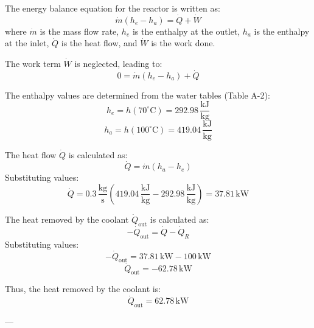 The energy balance equation for the reactor is written as:  
\[
\dot{m} \left( h_e - h_a \right) = \dot{Q} + \dot{W}
\]  
where \(\dot{m}\) is the mass flow rate, \(h_e\) is the enthalpy at the outlet, \(h_a\) is the enthalpy at the inlet, \(\dot{Q}\) is the heat flow, and \(\dot{W}\) is the work done.  

The work term \(\dot{W}\) is neglected, leading to:  
\[
0 = \dot{m} \left( h_e - h_a \right) + \dot{Q}
\]  

The enthalpy values are determined from the water tables (Table A-2):  
\[
h_e = h \left( 70^\circ\text{C} \right) = 292.98 \, \frac{\text{kJ}}{\text{kg}}
\]  
\[
h_a = h \left( 100^\circ\text{C} \right) = 419.04 \, \frac{\text{kJ}}{\text{kg}}
\]  

The heat flow \(\dot{Q}\) is calculated as:  
\[
\dot{Q} = \dot{m} \left( h_a - h_e \right)
\]  
Substituting values:  
\[
\dot{Q} = 0.3 \, \frac{\text{kg}}{\text{s}} \left( 419.04 \, \frac{\text{kJ}}{\text{kg}} - 292.98 \, \frac{\text{kJ}}{\text{kg}} \right) = 37.81 \, \text{kW}
\]  

The heat removed by the coolant \(\dot{Q}_{\text{out}}\) is calculated as:  
\[
-\dot{Q}_{\text{out}} = \dot{Q} - \dot{Q}_R
\]  
Substituting values:  
\[
-\dot{Q}_{\text{out}} = 37.81 \, \text{kW} - 100 \, \text{kW}
\]  
\[
\dot{Q}_{\text{out}} = -62.78 \, \text{kW}
\]  

Thus, the heat removed by the coolant is:  
\[
\dot{Q}_{\text{out}} = 62.78 \, \text{kW}
\]  

---